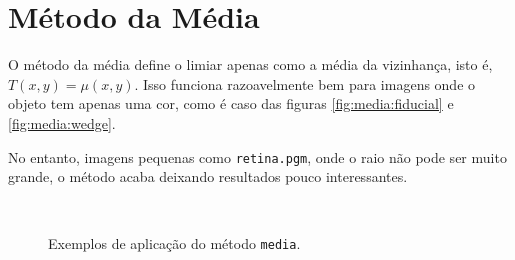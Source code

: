 \section{Método da Média}

O método da média define o limiar apenas como a média da vizinhança, isto é, $T(x, y) = \mu(x, y)$. Isso funciona razoavelmente bem para imagens onde o objeto tem apenas uma cor, como é caso das figuras \ref{fig:media:fiducial} e \ref{fig:media:wedge}.

No entanto, imagens pequenas como \texttt{retina.pgm}, onde o raio não pode ser muito grande, o método acaba deixando resultados pouco interessantes.

\begin{figure}[H]
    \centering
    \\[8pt]

    \caption{Exemplos de aplicação do método \texttt{media}.}
    \label{fig:media}
\end{figure}
